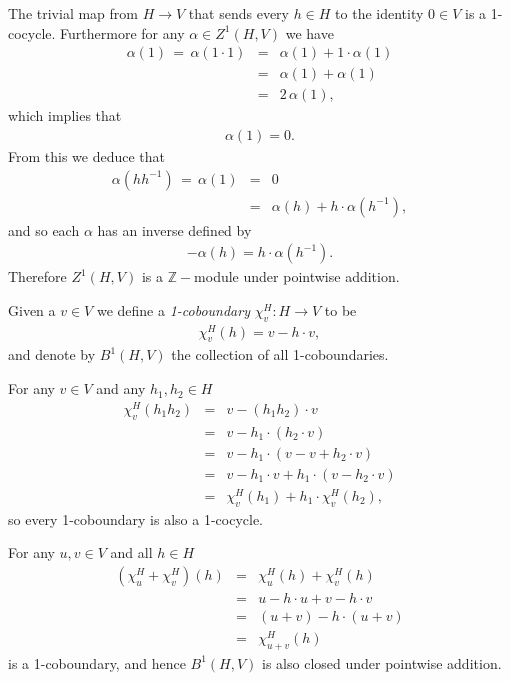 The trivial map from $H \rightarrow V$ that sends every $h \in H$ to the identity $0 \in V$ is a 1-cocycle. Furthermore for any $\alpha \in Z^1(H, V)$ we have
\begin{eqnarray*}
	\alpha(1)\, =\, \alpha(1\cdot 1) &=& \alpha(1) + 1\cdot \alpha(1) \\
	&=& \alpha(1) + \alpha(1) \\
	&=& 2\,\alpha(1),
\end{eqnarray*}
which implies that
\begin{eqnarray*}
\alpha(1) = 0.
\end{eqnarray*}
From this we deduce that
\begin{eqnarray*}
	\alpha(hh^{-1})\, =\, \alpha(1) &=& 0 \\
	&=& \alpha(h) + h\cdot \alpha(h^{-1}),
\end{eqnarray*}
and so each $\alpha$ has an inverse defined by
\begin{eqnarray*}
	-\alpha(h) = h\cdot\alpha(h^{-1}).
\end{eqnarray*}
Therefore $Z^1\left(H, V\right)$ is a $\mathbb{Z}-$module under pointwise addition.

Given a $v \in V$ we define a \emph{1-coboundary} $\chi^H_v:H\rightarrow V$ to be
\begin{eqnarray*}
	\chi^H_v (h) = v - h\cdot v,
\end{eqnarray*}
and denote by $B^1\left(H, V\right)$ the collection of all 1-coboundaries. 

For any $v \in V$ and any $h_1, h_2 \in H$
\begin{eqnarray*}
	\chi^H_v(h_1h_2) &=& v - (h_1h_2)\cdot v \\
	&=& v - h_1 \cdot \left(h_2\cdot v \right)\\
	&=& v - h_1 \cdot \left(v -v + h_2\cdot v \right)\\
	&=& v - h_1\cdot v + h_1\cdot \left( v - h_2\cdot v\right)\\
	&=& \chi^H_v(h_1) + h_1\cdot \chi^H_v(h_2),
\end{eqnarray*}
so every 1-coboundary is also a 1-cocycle. 

For any $u,v \in V$ and all $h \in H$
\begin{eqnarray*}
	(\chi^H_u + \chi^H_v)(h) &=& \chi^H_u(h) + \chi^H_v(h)\\
	&=& u - h\cdot u + v - h\cdot v \\
	&=& (u + v) - h\cdot (u + v) \\
	&=& \chi^H_{u + v} (h)
\end{eqnarray*}
is a 1-coboundary, and hence $B^1\left(H, V\right)$ is also closed under pointwise addition.

